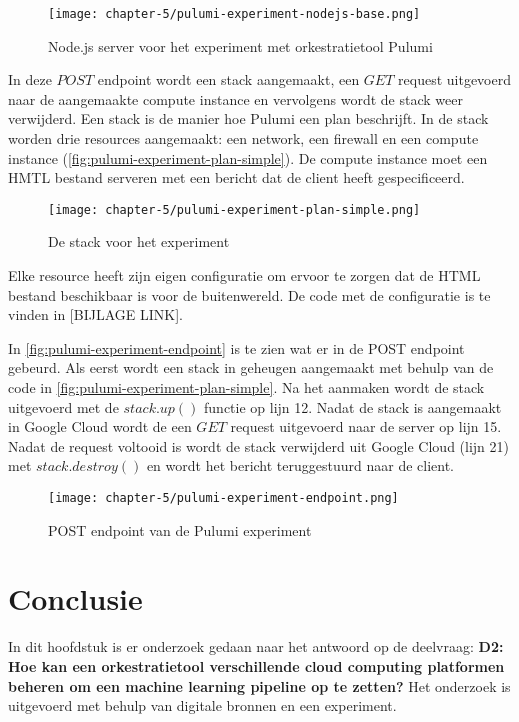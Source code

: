 \begin{figure}[hbt!]
  \centering
  \texttt{[image: chapter-5/pulumi-experiment-nodejs-base.png]}
  \caption{Node.js server voor het experiment met orkestratietool Pulumi}
  \label{fig:pulumi-experiment-nodejs-base}
\end{figure}

In deze \(POST\) endpoint wordt een stack aangemaakt, een \(GET\) request uitgevoerd naar de aangemaakte compute instance en vervolgens wordt de stack weer verwijderd. Een stack is de manier hoe Pulumi een plan beschrijft. In de stack worden drie resources aangemaakt: een network, een firewall en een compute instance (\autoref{fig:pulumi-experiment-plan-simple}). De compute instance moet een HMTL bestand serveren met een bericht dat de client heeft gespecificeerd. 

\begin{figure}[hbt!]
  \centering
  \texttt{[image: chapter-5/pulumi-experiment-plan-simple.png]}
  \caption{De stack voor het experiment}
  \label{fig:pulumi-experiment-plan-simple}
\end{figure}

Elke resource heeft zijn eigen configuratie om ervoor te zorgen dat de HTML bestand beschikbaar is voor de buitenwereld. De code met de configuratie is te vinden in [BIJLAGE LINK].

In \autoref{fig:pulumi-experiment-endpoint} is te zien wat er in de POST endpoint gebeurd. Als eerst wordt een stack in geheugen aangemaakt met behulp van de code in \autoref{fig:pulumi-experiment-plan-simple}. Na het aanmaken wordt de stack uitgevoerd met de \(stack.up()\) functie op lijn 12. Nadat de stack is aangemaakt in Google Cloud wordt de een \(GET\) request uitgevoerd naar de server op lijn 15. Nadat de request voltooid is wordt de stack verwijderd uit Google Cloud (lijn 21) met \(stack.destroy()\) en wordt het bericht teruggestuurd naar de client.

\begin{figure}[hbt!]
  \centering
  \texttt{[image: chapter-5/pulumi-experiment-endpoint.png]}
  \caption{POST endpoint van de Pulumi experiment}
  \label{fig:pulumi-experiment-endpoint}
\end{figure}

\section{Conclusie}\label{subsec:ch5-conclusie}
In dit hoofdstuk is er onderzoek gedaan naar het antwoord op de deelvraag: \textbf{D2: Hoe kan een orkestratietool verschillende cloud computing platformen beheren om een machine learning pipeline op te zetten?} Het onderzoek is uitgevoerd met behulp van digitale bronnen en een experiment.

